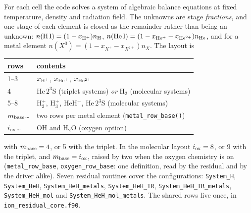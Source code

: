 For each cell the code solves a system of algebraic balance equations at
fixed temperature, density and radiation field. The unknowns are stage
\emph{fractions}, and one stage of each element is closed as the remainder
rather than being an unknown: $n({\rm H\,I}) = (1-x_{\rm H^+})n_{\rm H}$,
$n({\rm He\,I}) = (1-x_{\rm He^+}-x_{\rm He^{2+}})n_{\rm He}$, and for a metal
element $n(X^{0}) = (1-x_{X^+}-x_{X^{2+}})n_X$. The layout is

\begin{center}
\begin{tabular}{ll}
\toprule
rows & contents\\
\midrule
1--3 & $x_{\rm H^+}$, $x_{\rm He^+}$, $x_{\rm He^{2+}}$\\
4    & He\,$2^3$S (triplet systems) \emph{or} H$_2$ (molecular systems)\\
5--8 & H$_2^+$, H$_3^+$, HeH$^+$, He\,$2^3$S (molecular systems)\\
$m_{\rm base}$\dots & two rows per metal element
       (\texttt{metal\_row\_base()})\\
$i_{\rm ox}$\dots & OH and H$_2$O (oxygen option)\\
\bottomrule
\end{tabular}
\end{center}

with $m_{\rm base} = 4$, or 5 with the triplet. In the molecular layout
$i_{\rm ox} = 8$, or 9 with the triplet, and
$m_{\rm base} = i_{\rm ox}$, raised by two when the oxygen chemistry is on
(\texttt{metal\_row\_base}, \texttt{oxygen\_row\_base}: one definition, read
by the residual and by the driver alike). Seven residual routines cover the
configurations: \texttt{System\_H}, \texttt{System\_HeH},
\texttt{System\_HeH\_metals}, \texttt{System\_HeH\_TR},
\texttt{System\_HeH\_TR\_metals}, \texttt{System\_HeH\_mol} and
\texttt{System\_HeH\_mol\_metals}. The shared rows live once, in
\texttt{ion\_residual\_core.f90}.

